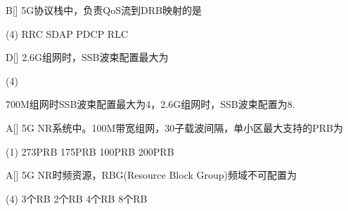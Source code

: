 \begin{choice}{B}[]
    5G协议栈中，负责QoS流到DRB映射的是
    \begin{tasks}(4)
        \task RRC
        \task SDAP
        \task PDCP
        \task RLC
    \end{tasks}
\end{choice}


\begin{choice}{D}[]
    2.6G组网时，SSB波束配置最大为
    \begin{tasks}(4)
    \end{tasks}
\end{choice}

\begin{solution}
 700M组网时SSB波束配置最大为4，2.6G组网时，SSB波束配置为8.
\end{solution}

\begin{choice}{A}[]
    5G NR系统中。100M带宽组网，30子载波间隔，单小区最大支持的PRB为
    \begin{tasks}(1)
        \task 273PRB
        \task 175PRB
        \task 100PRB
        \task 200PRB
    \end{tasks}
\end{choice}

\begin{choice}{A}[]
    5G NR时频资源，RBG(Resource Block Group)频域不可配置为
    \begin{tasks}(4)
        \task 3个RB
        \task 2个RB
        \task 4个RB
        \task 8个RB
    \end{tasks}
\end{choice}


